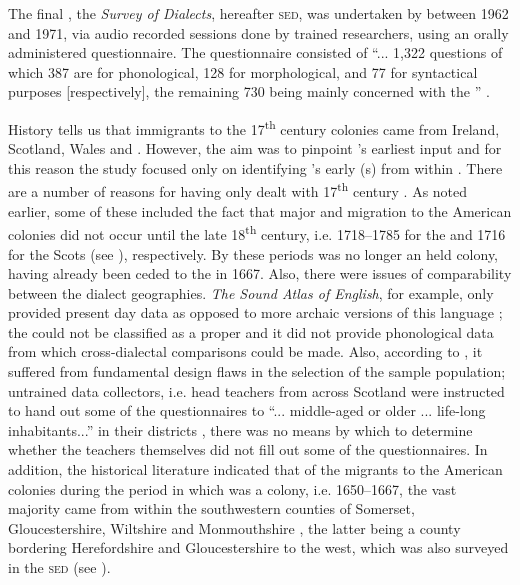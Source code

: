 The final , the \emph{Survey of  Dialects}, hereafter \textsc{sed}, was undertaken by \citet{Orton6271} between 1962 and 1971, via audio recorded sessions done by trained researchers, using an orally administered questionnaire. The questionnaire consisted of  ``... 1,322 questions of which 387 are for phonological, 128 for morphological, and 77 for syntactical purposes [respectively], the remaining 730 being mainly concerned with the '' \citep[15]{Orton62}.

History tells us that immigrants to the 17\textsuperscript{th} century  colonies came from Ireland, Scotland, Wales and . However, the aim was to pinpoint 's earliest  input and for this reason the study focused only on identifying 's early  (s) from within . There are a number of reasons for having only dealt with 17\textsuperscript{th} century . As noted earlier, some of these included the fact that major  and  migration to the American colonies did not occur until the late 18\textsuperscript{th} century, i.e. 1718--1785 for the  \citep{Griffin01} and 1716 for the Scots (see \citealt{Dobson05}), respectively. By these periods  was no longer an  held colony, having already been ceded to the  in 1667. Also, there were issues of comparability between the dialect geographies. \emph{The Sound Atlas of  English}, for example, only provided present day   data as opposed to more archaic versions of this language \citep{Hickey04}; the    could not be classified as a  proper and it did not provide phonological data from which cross-dialectal comparisons could be made. Also, according to  \citet{Macaulay77}, it suffered from fundamental design flaws in the selection of the sample population; untrained data collectors, i.e. head teachers from across Scotland were instructed to hand out some of the questionnaires to ``... middle-aged or older ... life-long inhabitants...'' in their districts \citep[14]{Macaulay77}, there was no means by which to determine whether the teachers themselves did not fill out some of the questionnaires. In addition, the historical literature indicated that of the migrants to the American colonies during the period in which  was a  colony, i.e. 1650--1667, the vast majority came from within the southwestern  counties of Somerset, Gloucestershire, Wiltshire and Monmouthshire \citep{Burg95, Schaefer98}, the latter being a  county bordering Herefordshire and Gloucestershire to the west, which was also surveyed in the \textsc{sed} (see ).


